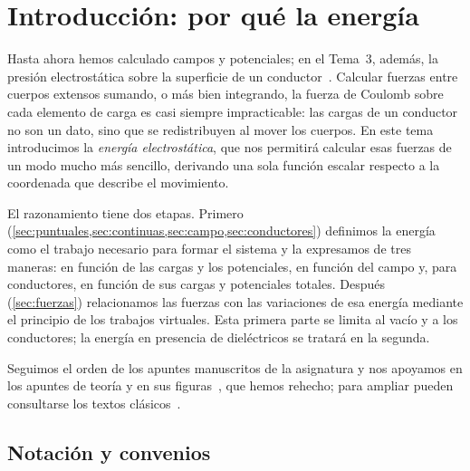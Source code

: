 \section{Introducción: por qué la energía}\label{sec:introduccion}

Hasta ahora hemos calculado campos y potenciales; en el Tema~3, además, la presión electrostática sobre la
superficie de un conductor~\cite{T3}. Calcular fuerzas entre cuerpos extensos sumando, o más bien integrando,
la fuerza de Coulomb sobre cada elemento de carga es casi siempre impracticable: las cargas de un conductor
no son un dato, sino que se redistribuyen al mover los cuerpos. En este tema introducimos la \emph{energía
electrostática}, que nos permitirá calcular esas fuerzas de un modo mucho más sencillo, derivando una sola
función escalar respecto a la coordenada que describe el movimiento.

El razonamiento tiene dos etapas. Primero (\cref{sec:puntuales,sec:continuas,sec:campo,sec:conductores}) definimos
la energía como el trabajo necesario para formar el sistema y la expresamos de tres maneras: en función de las
cargas y los potenciales, en función del campo y, para conductores, en función de sus cargas y potenciales
totales. Después (\cref{sec:fuerzas}) relacionamos las fuerzas con las variaciones de esa energía mediante el
principio de los trabajos virtuales. Esta primera parte se limita al vacío y a los conductores; la energía en
presencia de dieléctricos se tratará en la segunda.

Seguimos el orden de los apuntes manuscritos de la asignatura y nos apoyamos en los apuntes de teoría y en sus
figuras~\cite{DFA-teoria,DFA-figuras}, que hemos rehecho; para ampliar pueden consultarse los textos
clásicos~\cite{Griffiths,Wangsness,Purcell,Feynman,Jackson}.

\subsection{Notación y convenios}\label{sec:notacion}

